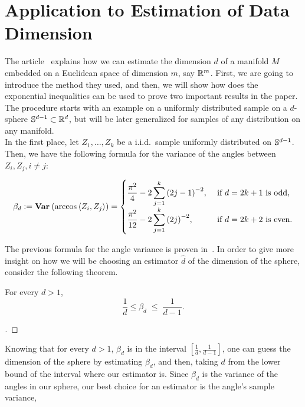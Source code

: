 \chapter{Application to Estimation of Data Dimension}
The article~\cite{diaz2019local} explains how we can estimate the dimension $d$ of a manifold $M$ embedded on a Euclidean space of dimension $m$, say $\R^m$. First, we are going to introduce the method they used, and then, we will show how does the exponential inequalities can be used to prove two important results in the paper. The procedure starts with an example on a uniformly distributed sample on a $d$-sphere $\S^{d-1} \subset \R^d$, but will be later generalized for samples of any distribution on any manifold.\\[1em]

In the first place, let $Z_1, \ldots, Z_k$ be a i.i.d.\ sample uniformly distributed on $\S^{d-1}$. Then, we have the following formula for the variance of the angles between $Z_i,Z_j, i\neq j$:

\begin{equation}\label{ade:1}\everymath{\displaystyle}
  \beta_d := \Var(\arccos \angles{Z_i,Z_j}) = \begin{cases}
    \frac{\pi^2}{4} - 2 \sum_{j = 1}^{k} {(2j-1)}^{-2}, & \mbox{ if } d = 2k+1 \mbox{ is odd},\\
    \frac{\pi^2}{12}- 2 \sum_{j = 1}^{k} {(2j)}^{-2}, & \mbox{ if } d = 2k+2 \mbox{ is even.}
  \end{cases}
\end{equation}

The previous formula for the angle variance is proven in~\cite{diaz2019local}. In order to give more insight on how we will be choosing an estimator $\widehat{d}$ of the dimension of the sphere, consider the following theorem.

\begin{theorem}\label{ade:T1}
  For every $d > 1$,
  \[ \frac{1}{d} \leq \beta_d \;\leq\; \frac{1}{d-1}. \] 
\end{theorem}
\begin{proof}[]

\end{proof}

\vspace*{1em}

Knowing that for every $d > 1$, $\beta_d$ is in the interval $[\tfrac{1}{d}, \tfrac{1}{d-1}]$, one can guess the dimension of the sphere by estimating $\beta_d$, and then, taking $d$ from the lower bound of the interval where our estimator is. Since $\beta_d$ is the variance of the angles in our sphere, our best choice for an estimator is the angle's sample variance,


